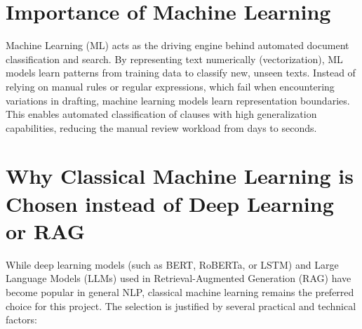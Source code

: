 \documentclass[12pt, a4paper]{report}
\begin{document}
\section{Importance of Machine Learning}
Machine Learning (ML) acts as the driving engine behind automated document classification and search. By representing text numerically (vectorization), ML models learn patterns from training data to classify new, unseen texts. Instead of relying on manual rules or regular expressions, which fail when encountering variations in drafting, machine learning models learn representation boundaries. This enables automated classification of clauses with high generalization capabilities, reducing the manual review workload from days to seconds.

\section{Why Classical Machine Learning is Chosen instead of Deep Learning or RAG}
While deep learning models (such as BERT, RoBERTa, or LSTM) and Large Language Models (LLMs) used in Retrieval-Augmented Generation (RAG) have become popular in general NLP, classical machine learning remains the preferred choice for this project. The selection is justified by several practical and technical factors:
\end{document}
